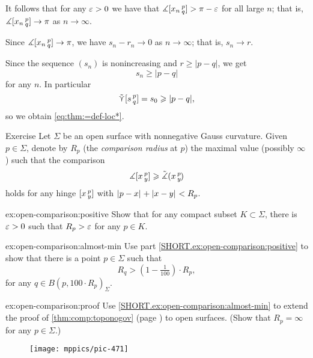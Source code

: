 It follows that for any $\varepsilon>0$ we have that $\measuredangle[x_n\,{}^{p}_{q}]> \pi-\varepsilon$ for all large $n$;
that is, $\measuredangle[x_n\,{}^{p}_{q}]\to \pi$ as $n\to\infty$.

Since $\measuredangle[x_n\,{}^{p}_{q}]\to \pi$, we have 
$s_n-r_n\to 0$ as $n\to\infty$;
that is, $s_n\to r$.

Since the sequence $(s_n)$ is nonincreasing and $r\ge |p-q|$, we get
\[s_n\ge |p-q|\]
for any $n$.
In particular
\[\tilde\curlyvee[s\,{}^{p}_{q}]=s_0\geqslant |p-q|,\] so we obtain \ref{eq:thm:=def-loc*}.
\qeds

\begin{thm}{Exercise}\label{ex:open-comparison}
Let $\Sigma$ be an open surface with nonnegative Gauss curvature.
Given $p\in\Sigma$, denote by $R_p$ 
(the \emph{comparison radius} at $p$) 
the maximal value (possibly $\infty$) such that the comparison 
\[\measuredangle[x\,{}^{p}_{y}]
\geqslant\tilde\measuredangle(x\,{}^{p}_{y}\hspace{-0.2ex})\]
holds for any hinge $[x\,{}^{p}_{y}]$ with $\dist{p}{x}{}+\dist{x}{y}{}<R_p$.

\begin{subthm}{ex:open-comparison:positive}
Show that for any compact subset $K\subset \Sigma$, there is $\varepsilon>0$ such that $R_p>\varepsilon$ for any $p\in K$.
\end{subthm}

\begin{subthm}{ex:open-comparison:almost-min}
Use part \ref{SHORT.ex:open-comparison:positive} to show that 
there is a point $p\in\Sigma$ such that 
\[R_q>(1-\tfrac1{100})\cdot R_p,\]
for any $q\in B(p,100\cdot R_p)_\Sigma$.
\end{subthm}

\begin{subthm}{ex:open-comparison:proof}
Use \ref{SHORT.ex:open-comparison:almost-min} to extend the proof of \ref{thm:comp:toponogov} (page \pageref{proof(thm:comp:toponogov)}) to open surfaces. 
(Show that $R_p=\infty$ for any $p\in\Sigma$.) 
\end{subthm}


\end{thm}


\begin{wrapfigure}{r}{30 mm}
\vskip4mm
\centering
\texttt{[image: mppics/pic-471]}
\end{wrapfigure}

